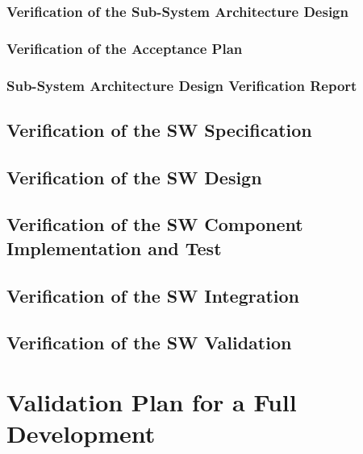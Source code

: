 \documentclass{template/openetcs_report}
\begin{document}
\subsection{Verification of the Sub-System Architecture Design}
\label{sec:verification-full-13}

%

\subsection{Verification of the Acceptance Plan}
\label{sec:verification-full-14}

%

\subsection{Sub-System Architecture Design Verification Report}
\label{sec:verification-full-15}

%

\section{Verification of the SW Specification}
\label{sec:verification-full-3}


\section{Verification of the SW Design}
\label{sec:verification-full-4}

\section{Verification of the SW Component Implementation and Test}
\label{sec:verification-full-5}

\section{Verification of the SW Integration}
\label{sec:verification-full-6}

\section{Verification of the SW Validation}
\label{sec:verification-full-7}




\chapter{Validation Plan for a Full Development}
\label{sec:validation-plan-full}
\end{document}
